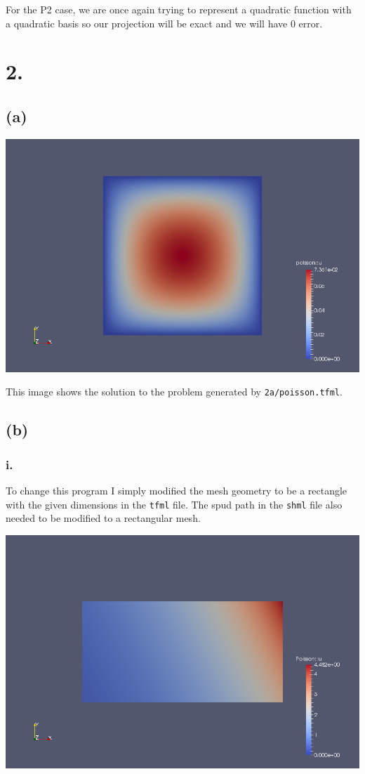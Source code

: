 \documentclass{article}
\begin{document}
For the P2 case, we are once again trying to represent a quadratic function with a quadratic basis so our projection will be exact and we will have 0 error.
\section*{2.}
\subsection*{(a)}
\includegraphics[width=\linewidth]{2a.png}

This image shows the solution to the problem generated by \verb|2a/poisson.tfml|.

\subsection*{(b)}
\subsubsection*{i.}
To change this program I simply modified the mesh geometry to be a rectangle with the given dimensions in the \verb|tfml| file. The spud path in the \verb|shml| file also needed to be modified to a rectangular mesh.

\includegraphics[width=\linewidth]{2biSolution.png}
\end{document}
